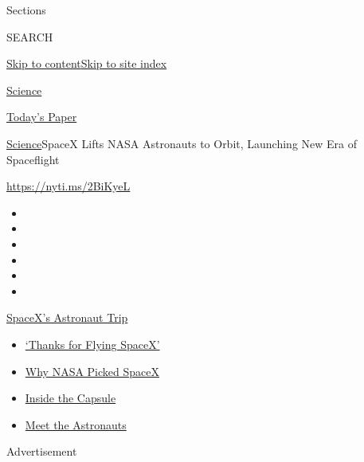 Sections

SEARCH

\protect\hyperlink{site-content}{Skip to
content}\protect\hyperlink{site-index}{Skip to site index}

\href{https://www.nytimes.com/section/science}{Science}

\href{https://myaccount.nytimes.com/auth/login?response_type=cookie\&client_id=vi}{}

\href{https://www.nytimes.com/section/todayspaper}{Today's Paper}

\href{/section/science}{Science}\textbar{}SpaceX Lifts NASA Astronauts
to Orbit, Launching New Era of Spaceflight

\url{https://nyti.ms/2BiKyeL}

\begin{itemize}
\item
\item
\item
\item
\item
\item
\end{itemize}

\href{https://www.nytimes.com/2020/08/02/science/spacex-astronauts-splashdown.html?action=click\&pgtype=Article\&state=default\&region=TOP_BANNER\&context=storylines_menu}{SpaceX's
Astronaut Trip}

\begin{itemize}
\tightlist
\item
  \href{https://www.nytimes.com/2020/08/02/science/spacex-astronauts-splashdown.html?action=click\&pgtype=Article\&state=default\&region=TOP_BANNER\&context=storylines_menu}{`Thanks
  for Flying SpaceX'}
\item
  \href{https://www.nytimes.com/2020/05/26/science/spacex-launch-nasa.html?action=click\&pgtype=Article\&state=default\&region=TOP_BANNER\&context=storylines_menu}{Why
  NASA Picked SpaceX}
\item
  \href{https://www.nytimes.com/interactive/2020/05/26/science/spacex-nasa.html?action=click\&pgtype=Article\&state=default\&region=TOP_BANNER\&context=storylines_menu}{Inside
  the Capsule}
\item
  \href{https://www.nytimes.com/2020/05/27/science/bob-behnken-doug-hurley.html?action=click\&pgtype=Article\&state=default\&region=TOP_BANNER\&context=storylines_menu}{Meet
  the Astronauts}
\end{itemize}

Advertisement

